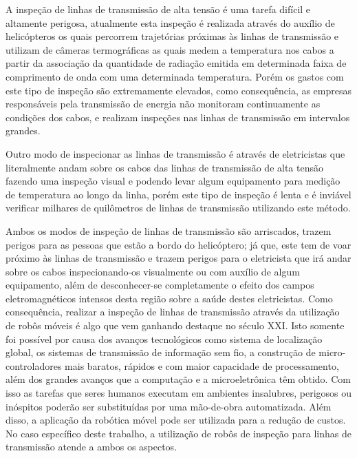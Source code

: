 
A inspeção de linhas de transmissão de alta tensão é uma tarefa difícil e altamente perigosa, atualmente esta inspeção é realizada através do auxílio de helicópteros os quais percorrem trajetórias próximas às linhas de transmissão e utilizam de câmeras termográficas as quais medem a temperatura nos cabos a partir da associação da quantidade de radiação emitida em determinada faixa de comprimento de onda com uma determinada temperatura. Porém os gastos com este tipo de inspeção são extremamente elevados, como consequência, as empresas responsáveis pela transmissão de energia não monitoram continuamente as condições dos cabos, e realizam inspeções nas linhas de transmissão em intervalos grandes.

Outro modo de inspecionar as linhas de transmissão é através de eletricistas que literalmente andam sobre os cabos das linhas de transmissão de alta tensão fazendo uma inspeção visual e podendo levar algum equipamento para medição de temperatura ao longo da linha, porém este tipo de inspeção é lenta e é inviável verificar milhares de quilômetros de linhas de transmissão utilizando este método.

Ambos os modos de inspeção de linhas de transmissão são arriscados, trazem perigos para as pessoas que estão a bordo do helicóptero; já que, este tem de voar próximo às linhas de transmissão e trazem perigos para o eletricista que irá andar sobre os cabos inspecionando-os visualmente ou com auxílio de algum equipamento, além de desconhecer-se completamente o efeito dos campos eletromagnéticos intensos desta região sobre a saúde destes eletricistas. Como consequência, realizar a inspeção de linhas de transmissão através da utilização de robôs móveis é algo que vem ganhando destaque no século XXI. Isto somente foi possível por causa dos avanços tecnológicos como sistema de localização global, os sistemas de transmissão de informação sem fio, a construção de micro-controladores mais baratos, rápidos e com maior capacidade de processamento, além dos grandes avanços que a computação e a microeletrônica têm obtido. Com isso as tarefas que seres humanos executam em ambientes insalubres, perigosos ou inóspitos poderão ser substituídas por uma mão-de-obra automatizada. Além disso, a aplicação da robótica móvel pode ser utilizada para a redução de custos.  No caso específico deste trabalho, a utilização de robôs de inspeção para linhas de transmissão atende a ambos os aspectos.

